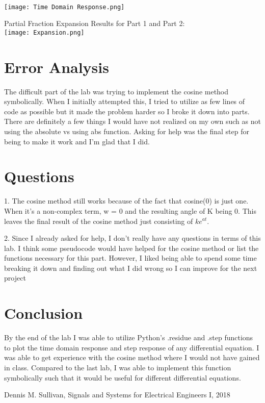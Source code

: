 \documentclass[12pt]{report}
\begin{document}
\\ \texttt{[image: Time Domain Response.png]}
\newpage

Partial Fraction Expansion Results for Part 1 and Part 2:
\\ \texttt{[image: Expansion.png]}



\section{Error Analysis}

The difficult part of the lab was trying to implement the cosine method symbolically. When I initially attempted this, I tried to utilize as few lines of code as possible but it made the problem harder so I broke it down into parts. There are definitely a few things I would have not realized on my own such as not using the absolute vs using abs function. Asking for help was the final step for being to make it work and I'm glad that I did.  

\section{Questions}
1. The cosine method still works because of the fact that cosine(0) is just one. When it's a non-complex term, w = 0 and the resulting angle of K being 0. This leaves the final result of the cosine method just consisting of $ke^{at}$.

2. Since I already asked for help, I don't really have any questions in terms of this lab. I think some pseudocode would have helped for the cosine method or list the functions necessary for this part. However, I liked being able to spend some time breaking it down and finding out what I did wrong so I can improve for the next project 

\section{Conclusion}

By the end of the lab I was able to utilize Python's .residue and .step functions to plot the time domain response and step response of any differential equation. I was able to get experience with the cosine method where I would not have gained in class. Compared to the last lab, I was able to implement this function symbolically such that it would be useful for different differential equations. 

\newpage


\begin{thebibliography}{111}
Dennis M. Sullivan,
Signals and Systems for Electrical Engineers I,
 2018
\end{thebibliography}
\end{document}
